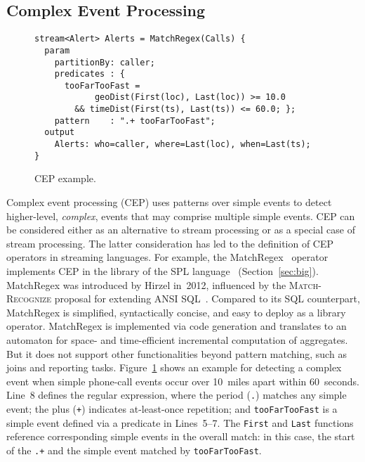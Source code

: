 \subsection{Complex Event Processing}\label{sec:cep} %


\begin{figure}[!h]
\begin{lstlisting}
stream<Alert> Alerts = MatchRegex(Calls) {
  param
    partitionBy: caller;
    predicates : {
      tooFarTooFast =
            geoDist(First(loc), Last(loc)) >= 10.0
        && timeDist(First(ts), Last(ts)) <= 60.0; };
    pattern    : ".+ tooFarTooFast";
  output
    Alerts: who=caller, where=Last(loc), when=Last(ts);
}
\end{lstlisting}
\vspace*{-4mm}
\caption{\label{fig:cep}CEP example.}
\end{figure}


Complex event processing (CEP) uses patterns over simple events to
detect higher-level, \emph{complex}, events that may comprise multiple
simple events.  CEP can be considered either as an alternative to
stream processing or as a special case of stream processing. The
latter consideration has led to the definition of CEP operators in
streaming languages. For example, the MatchRegex~\cite{hirzel_2012}
operator implements CEP in the library of the SPL
language~\cite{hirzel_schneider_gedik_2017} (Section~\ref{sec:big}). MatchRegex was introduced by Hirzel in~2012,
influenced by the \textsc{Match-Recognize} proposal for extending ANSI
SQL~\cite{zemke_et_al_2007}.  Compared to its SQL counterpart,
MatchRegex is simplified, syntactically concise, and easy to deploy as
a library operator. MatchRegex is implemented via code generation and
translates to an automaton for space- and time-efficient incremental
computation of aggregates. But it does not support other
functionalities beyond pattern matching, such as joins and reporting
tasks. Figure~\ref{fig:cep} shows an example for detecting a complex
event when simple phone-call events occur over 10~miles apart within
60~seconds. Line~8 defines the regular expression, where the period
(\lstinline{.}) matches any simple event; the plus (\lstinline{+})
indicates at-least-once repetition; and \lstinline{tooFarTooFast} is a
simple event defined via a predicate in \mbox{Lines 5--7}. The
\lstinline{First} and \lstinline{Last} functions reference
corresponding simple events in the overall match: in this case, the
start of the \lstinline{.+} and the simple event matched by
\lstinline{tooFarTooFast}.

